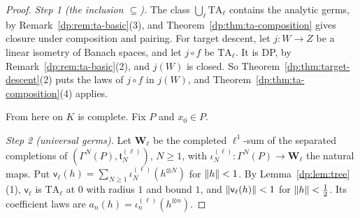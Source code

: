 \begin{proof}
\emph{Step 1 (the inclusion $\subseteq$).} The class $\bigcup_\ell\mathrm{TA}_\ell$ contains the analytic germs, by Remark~\ref{dp:rem:ta-basic}(3), and Theorem~\ref{dp:thm:ta-composition} gives closure under composition and pairing. For target descent, let $j\colon W\to Z$ be a linear isometry of Banach spaces, and let $j\circ f$ be $\mathrm{TA}_\ell$. It is DP, by Remark~\ref{dp:rem:ta-basic}(2), and $j(W)$ is closed. So Theorem~\ref{dp:thm:target-descent}(2) puts the laws of $j\circ f$ in $j(W)$, and Theorem~\ref{dp:thm:ta-composition}(4) applies.

From here on $K$ is complete. Fix $P$ and $x_0\in P$.

\emph{Step 2 (universal germs).} Let $\mathbf W_\ell$ be the completed $\ell^1$-sum of the separated completions of $(\Gamma^N(P),\mathfrak t^{(\ell)}_N)$, $N\ge1$, with $\iota^{(\ell)}_N\colon\Gamma^N(P)\to\mathbf W_\ell$ the natural maps. Put $\mathsf v_\ell(h)=\sum_{N\ge1}\iota^{(\ell)}_N(h^{\otimes N})$ for $\lVert h\rVert<1$. By Lemma~\ref{dp:lem:tree}(1), $\mathsf v_\ell$ is $\mathrm{TA}_\ell$ at $0$ with radius $1$ and bound $1$, and $\lVert \mathsf v_\ell(h)\rVert<1$ for $\lVert h\rVert<\frac12$. Its coefficient laws are $a_n(h)=\iota^{(\ell)}_n(h^{\otimes n})$.


\end{proof}
